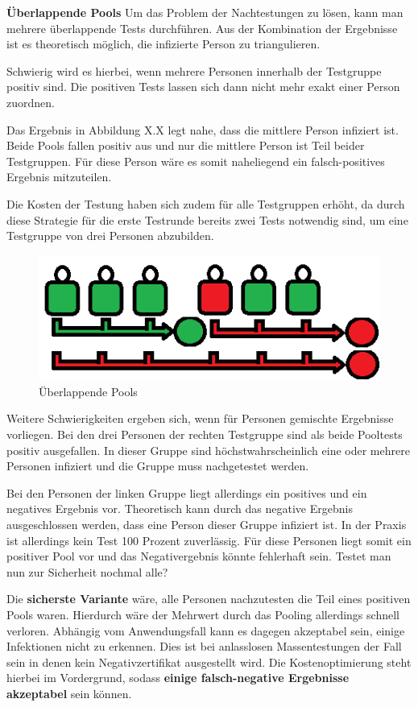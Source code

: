 \textbf{Überlappende Pools}\newline
Um das Problem der Nachtestungen zu lösen, kann man mehrere überlappende Tests durchführen.
Aus der Kombination der Ergebnisse ist es theoretisch möglich, die infizierte Person zu triangulieren.

Schwierig wird es hierbei, wenn mehrere Personen innerhalb der Testgruppe positiv sind.
Die positiven Tests lassen sich dann nicht mehr exakt einer Person zuordnen.

Das Ergebnis in Abbildung X.X legt nahe, dass die mittlere Person infiziert ist.
Beide Pools fallen positiv aus und nur die mittlere Person ist Teil beider Testgruppen.
Für diese Person wäre es somit naheliegend ein falsch-positives Ergebnis mitzuteilen.

Die Kosten der Testung haben sich zudem für alle Testgruppen erhöht, da durch diese Strategie für die erste Testrunde bereits zwei Tests notwendig sind, um eine Testgruppe von drei Personen abzubilden.

\cleardoublepage
\begin{figure}[h]
	\centering
	\includegraphics[width=.8\textwidth]{img/GrossePooluebersicht}
	\caption{Überlappende Pools}
\end{figure}

Weitere Schwierigkeiten ergeben sich, wenn für Personen gemischte Ergebnisse vorliegen.
Bei den drei Personen der rechten Testgruppe sind als beide Pooltests positiv ausgefallen.
In dieser Gruppe sind höchstwahrscheinlich eine oder mehrere Personen infiziert und die Gruppe muss nachgetestet werden.

Bei den Personen der linken Gruppe liegt allerdings ein positives und ein negatives Ergebnis vor.
Theoretisch kann durch das negative Ergebnis ausgeschlossen werden, dass eine Person dieser Gruppe infiziert ist.
In der Praxis ist allerdings kein Test 100 Prozent zuverlässig.
Für diese Personen liegt somit ein positiver Pool vor und das Negativergebnis könnte fehlerhaft sein.
Testet man nun zur Sicherheit nochmal alle?

Die \textbf{sicherste Variante} wäre, alle Personen nachzutesten die Teil eines positiven Pools waren.
Hierdurch wäre der Mehrwert durch das Pooling allerdings schnell verloren.
Abhängig vom Anwendungsfall kann es dagegen akzeptabel sein, einige Infektionen nicht zu erkennen.
Dies ist bei anlasslosen Massentestungen der Fall sein in denen kein Negativzertifikat ausgestellt wird.
Die Kostenoptimierung steht hierbei im Vordergrund, sodass \textbf{einige falsch-negative Ergebnisse akzeptabel} sein können. 

